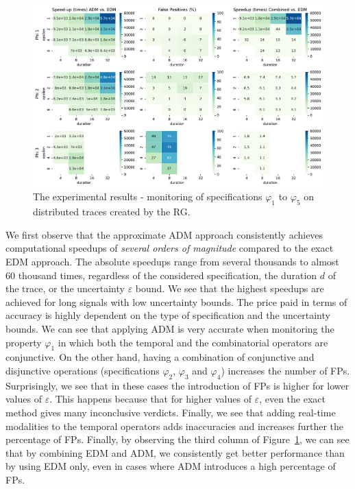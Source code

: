 \begin{figure}
	\begin{center}
	\includegraphics[width=\linewidth]{speedup}
\caption{The experimental results - monitoring of specifications $\varphi_{1}$ to $\varphi_{5}$ on distributed traces created by the RG.}
\label{fig:rgresults}
\end{center}
\vspace{1em}
\end{figure}

We first observe that the approximate ADM approach consistently achieves computational speedups of \emph{several orders of magnitude} 
compared to the exact EDM approach. The absolute speedups range from several thousands to almost 60 thousand times, regardless of the considered specification, the duration $d$ of the trace, or the uncertainty $\varepsilon$ bound. We see that the highest speedups are achieved for long signals with low uncertainty bounds. The price paid in terms of accuracy is highly dependent on the type of specification and the uncertainty bounds. We can see that applying ADM is very accurate when monitoring the property 
$\varphi_1$ in which both the temporal and the combinatorial operators are conjunctive. On the other hand, having a combination of conjunctive and disjunctive operations (specifications $\varphi_{2}$, $\varphi_{3}$ and $\varphi_{4}$) increases the number of FPs.  Surprisingly, we see that in these cases the introduction of FPs is higher for lower values of $\varepsilon$. This happens because that for higher values of $\varepsilon$,  even the exact method gives many inconclusive verdicts. Finally, we see that adding real-time modalities to the temporal operators adds inaccuracies and increases further the percentage of FPs. Finally, by observing the third column of Figure~\ref{fig:rgresults}, we can see that by combining EDM and ADM, we consistently get better performance than by using EDM only, even in cases where ADM introduces a high percentage of FPs.



